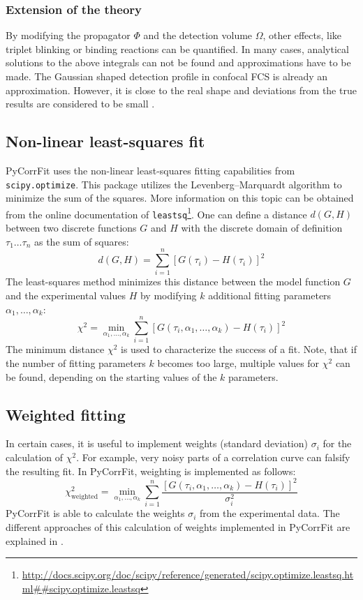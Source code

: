 	
	\subsubsection{Extension of the theory}
	By modifying the propagator $\Phi$ and the detection volume $\Omega$, other effects, like triplet blinking or binding reactions can be quantified. In many cases, analytical solutions to the above integrals can not be found and approximations have to be made. The Gaussian shaped detection profile in confocal FCS is already an approximation. However, it is close to the real shape and deviations from the true results are considered to be small \cite{Zhang2007}.


\subsection{Non-linear least-squares fit}
\label{cha:PyCorFit_leastsq}
PyCorrFit uses the non-linear least-squares fitting capabilities from \texttt{scipy.optimize}. This package utilizes the Levenberg–Marquardt algorithm to minimize the sum of the squares. More information on this topic can be obtained from the online documentation of \texttt{leastsq}\footnote{\url{http://docs.scipy.org/doc/scipy/reference/generated/scipy.optimize.leastsq.html##scipy.optimize.leastsq}}. 
One can define a distance $d(G,H)$ between two discrete functions $G$ and $H$ with the discrete domain of definition $\tau_1 \dots \tau_n$ as the sum of squares:
\begin{equation}
d(G,H) = \sum_{i=1}^n \left[ G(\tau_i) - H(\tau_i) \right]^2
\end{equation}
The least-squares method minimizes this distance between the model function $G$ and the experimental values $H$ by modifying $k$ additional fitting parameters $\alpha_1, \dots, \alpha_k$:
\begin{equation}
\chi^2 = \min_{\alpha_1, \dots, \alpha_k} \sum_{i=1}^n \left[ G(\tau_i,\alpha_1, \dots, \alpha_k) - H(\tau_i) \right]^2
\end{equation}
The minimum distance $\chi^2$ is used to characterize the success of a fit. Note, that if the number of fitting parameters $k$ becomes too large, multiple values for $\chi^2$ can be found, depending on the starting values of the $k$ parameters.


\subsection{Weighted fitting}
In certain cases, it is useful to implement weights (standard deviation) $\sigma_i$ for the calculation of $\chi^2$. For example, very noisy parts of a correlation curve can falsify the resulting fit. In PyCorrFit, weighting is implemented as follows:
\begin{equation}
\chi^2_\mathrm{weighted} = \min_{\alpha_1, \dots, \alpha_k} \sum_{i=1}^n  \frac{\left[ G(\tau_i,\alpha_1, \dots, \alpha_k) - H(\tau_i) \right]^2}{\sigma_i^2}
\end{equation}
PyCorrFit is able to calculate the weights $\sigma_i$ from the experimental data. The different approaches of this calculation of weights implemented in PyCorrFit are explained in .



